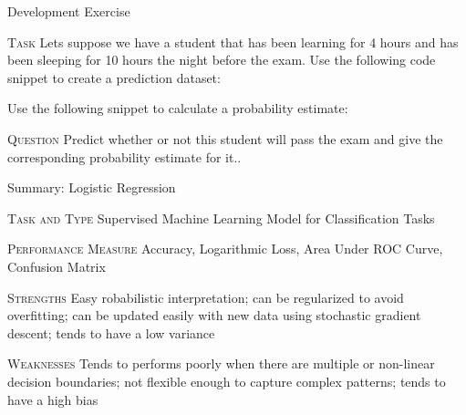 \documentclass[document.tex]{subfiles}
\begin{document}
    \begin{frame}{Development Exercise }
        \begin{alertblock}{\textsc{Task}}
            Lets suppose we have a student that has been learning for 4 hours and has been sleeping for 10 hours the night before the exam. Use the following code snippet to create a prediction dataset:
            
            
            Use the following snippet to calculate a probability estimate:
            
            
        \end{alertblock}
        \begin{alertblock}{\textsc{Question}}
            Predict whether or not this student will pass the exam and give the corresponding probability estimate for it..
        \end{alertblock}
    \end{frame}

    \begin{frame}{Summary: Logistic Regression}
        \begin{alertblock}{\textsc{Task and Type}}
            Supervised Machine Learning Model for Classification Tasks
        \end{alertblock}
        \begin{alertblock}{\textsc{Performance Measure}}
            Accuracy, Logarithmic Loss, Area Under ROC Curve, Confusion Matrix
        \end{alertblock}
        \begin{alertblock}{\textsc{Strengths}}
            Easy robabilistic interpretation; can be regularized to avoid overfitting; can be updated easily with new data using stochastic gradient descent; tends to have a low variance
        \end{alertblock}
        \begin{alertblock}{\textsc{Weaknesses}}
            Tends to performs poorly when there are multiple or non-linear decision boundaries; not flexible enough to capture complex patterns; tends to have a high bias
        \end{alertblock}
    \end{frame}
\end{document}
